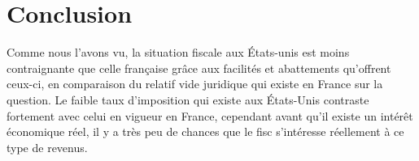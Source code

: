     \section{Conclusion}
        Comme nous l'avons vu, la situation fiscale aux États-unis est moins
        contraignante que celle française  grâce aux
        facilités et abattements qu'offrent ceux-ci, en comparaison
        du relatif vide juridique qui existe en France sur la question.
        Le faible taux d'imposition qui existe aux États-Unis contraste
        fortement avec celui en vigueur en France, cependant avant qu'il
        existe un intérêt économique réel, il y a très peu de
        chances que le fisc s'intéresse réellement à ce type de revenus.
